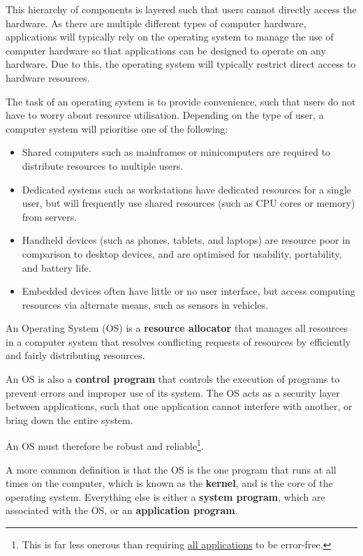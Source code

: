 \documentclass{article}
\begin{document}
This hierarchy of components is layered such that users cannot directly
access the hardware. As there are multiple different types of computer
hardware, applications will typically rely on the operating system to
manage the use of computer hardware so that applications can be designed
to operate on any hardware. Due to this, the operating system will
typically restrict direct access to hardware resources.

The task of an operating system is to provide convenience, such that
users do not have to worry about resource utilisation. Depending on the
type of user, a computer system will prioritise one of the following:
\begin{itemize}
    \item Shared computers such as mainframes or minicomputers are
          required to distribute resources to multiple users.
    \item Dedicated systems such as workstations have dedicated
          resources for a single user, but will frequently use shared
          resources (such as CPU cores or memory) from servers.
    \item Handheld devices (such as phones, tablets, and laptops) are
          resource poor in comparison to desktop devices, and are
          optimised for usability, portability, and battery life.
    \item Embedded devices often have little or no user interface, but
          access computing resources via alternate means, such as
          sensors in vehicles.
\end{itemize}
\begin{definition}
    An Operating System (OS) is a \textbf{resource allocator} that
    manages all resources in a computer system that resolves conflicting
    requests of resources by efficiently and fairly distributing
    resources.

    An OS is also a \textbf{control program} that controls the
    execution of programs to prevent errors and improper use of its
    system. The OS acts as a security layer between applications, such
    that one application cannot interfere with another, or bring down
    the entire system.

    An OS must therefore be robust and reliable\footnote{This is far
    less onerous than requiring \underline{all applications} to be
    error-free.}.
\end{definition}
A more common definition is that the OS is the one program that runs
at all times on the computer, which is known as the \textbf{kernel},
and is the core of the operating system.
Everything else is either a \textbf{system program}, which are
associated with the OS, or an \textbf{application program}.
\end{document}
